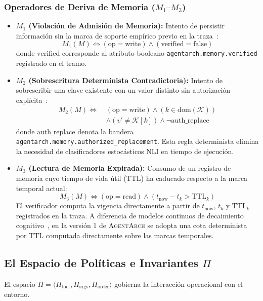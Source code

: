 \documentclass[conference]{IEEEtran}
\begin{document}
\subsubsection{Operadores de Deriva de Memoria ($M_1\text{--}M_3$)}
\begin{itemize}
    \item \textbf{$M_1$ (Violaci\'on de Admisi\'on de Memoria):} Intento de persistir informaci\'on sin la marca de soporte emp\'irico previo en la traza~\cite{qi2026}:
    \begin{equation}
    M_1(M) \iff (\text{op} = \text{write}) \wedge (\text{verified} = \text{false})
    \end{equation}
    donde $\text{verified}$ corresponde al atributo booleano \texttt{agentarch.memory.verified} registrado en el tramo.
    \item \textbf{$M_2$ (Sobrescritura Determinista Contradictoria):} Intento de sobrescribir una clave existente con un valor distinto sin autorizaci\'on expl\'icita~\cite{rafique2026}:
    \begin{equation}
    \begin{split}
    M_2(M) \iff \; & (\text{op} = \text{write}) \wedge (k \in \text{dom}(\mathcal{K})) \\
    & \wedge (v' \neq \mathcal{K}[k]) \wedge \neg \text{auth\_replace}
    \end{split}
    \end{equation}
    donde $\text{auth\_replace}$ denota la bandera \texttt{agentarch.memory.authorized\_replacement}. Esta regla determinista elimina la necesidad de clasificadores estoc\'asticos NLI en tiempo de ejecuci\'on.
    \item \textbf{$M_3$ (Lectura de Memoria Expirada):} Consumo de un registro de memoria cuyo tiempo de vida \'util (TTL) ha caducado respecto a la marca temporal actual:
    \begin{equation}
    M_3(M) \iff (\text{op} = \text{read}) \wedge (t_{\text{now}} - t_k > \text{TTL}_k)
    \end{equation}
    El verificador computa la vigencia directamente a partir de $t_{\text{now}}$, $t_k$ y $\text{TTL}_k$ registrados en la traza. A diferencia de modelos continuos de decaimiento cognitivo~\cite{sureshkumar2026}, en la versi\'on 1 de \textsc{AgentArch} se adopta una cota determinista por TTL computada directamente sobre las marcas temporales.
\end{itemize}

\subsection{El Espacio de Pol\'iticas e Invariantes $\Pi$}
El espacio $\Pi = \langle \Pi_{\text{tool}}, \Pi_{\text{args}}, \Pi_{\text{order}} \rangle$ gobierna la interacci\'on operacional con el entorno.
\end{document}

